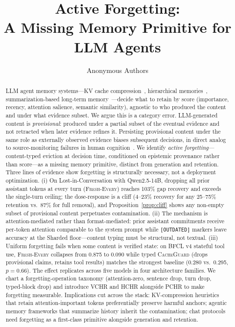 \documentclass{article}
\title{Active Forgetting: \\ A Missing Memory Primitive for LLM Agents}
\author{Anonymous Authors}
\begin{document}
\maketitle

\begin{abstract}
LLM agent memory systems---KV cache compression~\citep{zhang2023h2o,xiao2024streamingllm,li2024snapkv}, hierarchical memories~\citep{packer2023memgpt,li2025memos,park2023generative}, summarization-based long-term memory~\citep{wu2023recursivesumm}---decide what to retain by score (importance, recency, attention salience, semantic similarity), agnostic to who produced the content and under what evidence subset. We argue this is a category error. LLM-generated content is \emph{provisional}: produced under a partial subset of the eventual evidence and not retracted when later evidence refines it. Persisting provisional content under the same role as externally observed evidence biases subsequent decisions, in direct analog to source-monitoring failures in human cognition~\citep{johnson1993source}. We identify \emph{active forgetting}---content-typed eviction at decision time, conditioned on epistemic provenance rather than score---as a missing memory primitive, distinct from generation and retention. Three lines of evidence show forgetting is structurally necessary, not a deployment optimization. (i) On Lost-in-Conversation with Qwen2.5-14B, dropping all prior assistant tokens at every turn (\textsc{Fresh-Every}) reaches 103\% gap recovery and exceeds the single-turn ceiling; the dose-response is a cliff (4--23\% recovery for any 25--75\% retention vs.\ 87\% for full removal), and Proposition~\ref{prop:cliff} shows any non-empty subset of provisional content perpetuates contamination. (ii) The mechanism is attention-mediated rather than format-mediated: prior assistant commitments receive per-token attention comparable to the system prompt while \texttt{[OUTDATED]} markers leave accuracy at the Sharded floor---content typing must be structural, not textual. (iii) Uniform forgetting fails when some content is verified state: on BFCL v4 stateful tool use, \textsc{Fresh-Every} collapses from 0.875 to 0.090 while typed \textsc{CacheGuard} (drops provisional claims, retains tool results) matches the strongest baseline (0.280 vs.\ 0.295, $p{=}0.66$). The effect replicates across five models in four architecture families. We chart a forgetting-operation taxonomy (attention-zero, sentence drop, turn drop, typed-block drop) and introduce VCHR and HCHR alongside PCHR to make forgetting measurable. Implications cut across the stack: KV-compression heuristics that retain attention-important tokens preferentially preserve harmful anchors; agentic memory frameworks that summarize history inherit the contamination; chat protocols need forgetting as a first-class primitive alongside generation and retention.
\end{abstract}
\end{document}
